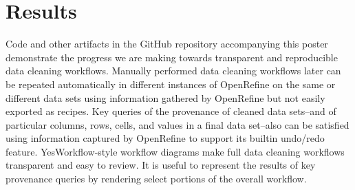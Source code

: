 \section{Results}

Code and other artifacts in the GitHub repository accompanying this poster demonstrate the progress we are making towards transparent and reproducible data cleaning workflows. Manually performed data cleaning workflows later can be repeated automatically in different instances of OpenRefine on the same or different data sets using information gathered by OpenRefine but not easily exported as recipes. Key queries of the provenance of cleaned data sets--and of particular columns, rows, cells, and values in a final data set--also can be satisfied using information captured by OpenRefine to support its builtin undo/redo feature. YesWorkflow-style workflow diagrams make full data cleaning workflows transparent and easy to review. It is useful to represent the results of key provenance queries by rendering select portions of the overall workflow.